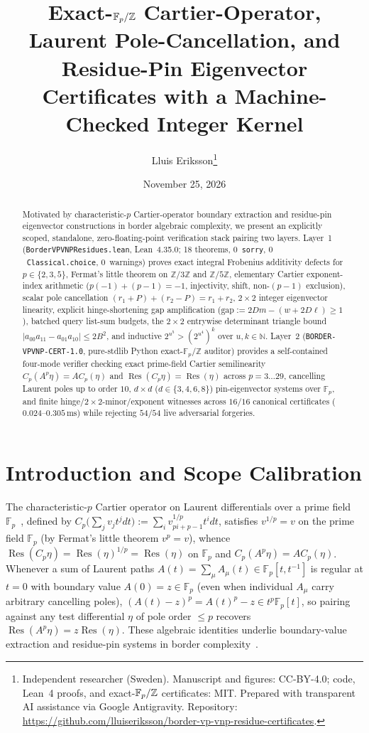 \documentclass[10pt,twocolumn]{article}
\title{\vspace{-0.8em}\bfseries Exact-$\FF_p/\ZZ$ Cartier-Operator, Laurent Pole-Cancellation, and Residue-Pin Eigenvector Certificates with a Machine-Checked Integer Kernel}
\author{Lluis Eriksson\thanks{Independent researcher (Sweden). Manuscript and figures: CC-BY-4.0; code, Lean~4 proofs, and exact-$\FF_p/\ZZ$ certificates: MIT. Prepared with transparent AI assistance via Google Antigravity. Repository: \url{https://github.com/lluiseriksson/border-vp-vnp-residue-certificates}.}}
\date{November 25, 2026}
\newcommand{\ZZ}{\mathbb{Z}}
\newcommand{\NN}{\mathbb{N}}
\newcommand{\FF}{\mathbb{F}}
\newcommand{\Res}{\operatorname{Res}}
\newcommand{\certschema}{\texttt{BORDER-VPVNP-CERT-1.0}}
\begin{document}
\maketitle
\vspace{-1.1em}

\begin{abstract}
Motivated by characteristic-$p$ Cartier-operator boundary extraction and residue-pin eigenvector constructions in border algebraic complexity, we present an explicitly scoped, standalone, zero-floating-point verification stack pairing two layers. Layer~1 (\texttt{BorderVPVNPResidues.lean}, Lean~4.35.0; 18 theorems, $0$~\texttt{sorry}, $0$~\texttt{Classical.choice}, $0$~warnings) proves exact integral Frobenius additivity defects for $p\in\{2,3,5\}$, Fermat's little theorem on $\ZZ/3\ZZ$ and $\ZZ/5\ZZ$, elementary Cartier exponent-index arithmetic ($p(-1)+(p-1)=-1$, injectivity, shift, non-$(p-1)$ exclusion), scalar pole cancellation $(r_1+P)+(r_2-P)=r_1+r_2$, $2\times 2$ integer eigenvector linearity, explicit hinge-shortening gap amplification ($\mathrm{gap}:=2Dm-(w+2D\ell)\ge 1$), batched query list-sum budgets, the $2\times 2$ entrywise determinant triangle bound $|a_{00}a_{11}-a_{01}a_{10}|\le 2B^2$, and inductive $2^{u^5} > (2^{u^4})^k$ over $u,k\in\NN$. Layer~2 (\certschema{}, pure-stdlib Python exact-$\FF_p/\ZZ$ auditor) provides a self-contained four-mode verifier checking exact prime-field Cartier semilinearity $C_p(A^p\eta)=A C_p(\eta)$ and $\Res(C_p\eta)=\Res(\eta)$ across $p=3\dots 29$, cancelling Laurent poles up to order $10$, $d\times d$ ($d\in\{3,4,6,8\}$) pin-eigenvector systems over $\FF_p$, and finite hinge/$2\times 2$-minor/exponent witnesses across $16/16$ canonical certificates ($0.024$--$0.305\,\mathrm{ms}$) while rejecting $54/54$ live adversarial forgeries.
\end{abstract}

\section{Introduction and Scope Calibration}
The characteristic-$p$ Cartier operator on Laurent differentials over a prime field $\FF_p$~\cite{stohr1986weierstrass}, defined by $C_p\bigl(\sum_j v_j t^j dt\bigr) := \sum_i v_{pi + p - 1}^{1/p} t^i dt$, satisfies $v^{1/p} = v$ on the prime field $\FF_p$ (by Fermat's little theorem $v^p = v$), whence $\Res(C_p\eta) = \Res(\eta)^{1/p} = \Res(\eta)$ on $\FF_p$ and $C_p(A^p\eta) = A C_p(\eta)$. Whenever a sum of Laurent paths $A(t) = \sum_\mu A_\mu(t)\in\FF_p[t,t^{-1}]$ is regular at $t=0$ with boundary value $A(0)=z\in\FF_p$ (even when individual $A_\mu$ carry arbitrary cancelling poles), $(A(t)-z)^p = A(t)^p - z \in t^p\FF_p[t]$, so pairing against any test differential $\eta$ of pole order $\le p$ recovers $\Res(A^p\eta) = z\Res(\eta)$. These algebraic identities underlie boundary-value extraction and residue-pin systems in border complexity~\cite{valiant1979completeness,mulmuley2001geometric,openai2026vpvnp,openai2026hierarchy}.
\end{document}
